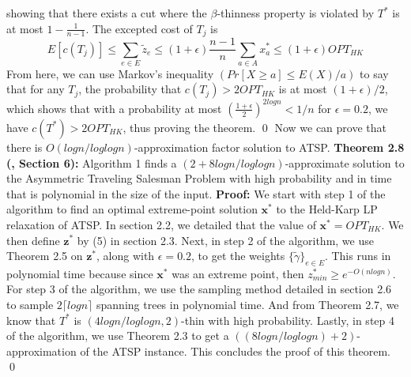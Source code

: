 \documentclass[oneside]{projectpaper} %
\begin{document}
showing that there exists a cut where the $\beta$-thinness property is violated by $T^*$ is at most $1 - \frac{1}{n - 1}$. The excepted cost of $T_j$ is
\begin{equation*}
E[c(T_j)] \leq \sum\limits_{e \in E}\tilde{z}_e \leq (1 + \epsilon)\frac{n - 1}{n}\sum\limits_{a \in A}x_{a}^{*} \leq (1 + \epsilon)OPT_{HK}
\end{equation*}
From here, we can use Markov's inequality $(Pr[X \geq a] \leq E(X)/a)$ to say that for any $T_j$, the probability that $c(T_j) > 2OPT_{HK}$ is at most $(1 + \epsilon)/2$, which shows that with a probability at most $(\frac{1+\epsilon}{2})^{2logn} < 1/n$ for $\epsilon = 0.2$, we have $c(T^*) > 2OPT_{HK}$, thus proving the theorem. \hfill\qed
\newline
\newline
Now we can prove that there is $O(logn / loglogn)$-approximation factor solution to ATSP.
\newline
\newline
\textbf{Theorem 2.8 (\cite{AGM10}, Section 6):} Algorithm 1 finds a $(2 + 8logn / loglogn)$-approximate solution to the Asymmetric Traveling Salesman Problem with high probability and in time that is polynomial in the size of the input.
\newline
\newline
\textbf{Proof:} We start with step 1 of the algorithm to find an optimal extreme-point solution $\textbf{x}^*$ to the Held-Karp LP relaxation of ATSP. In section 2.2, we detailed that the value of $\textbf{x}^* = OPT_{HK}$. We then define $\textbf{z}^*$ by (5) in section 2.3. \newline
\indent Next, in step 2 of the algorithm, we use Theorem 2.5 on $\textbf{z}^*$, along with $\epsilon = 0.2$, to get the weights $\{\tilde{\gamma}\}_{e \in E}$. This runs in polynomial time because since $\textbf{x}^*$ was an extreme point, then $z_{min}^{*} \geq e^{-O(nlogn)}$. \newline
\indent For step 3 of the algorithm, we use the sampling method detailed in section 2.6 to sample $2\lceil logn \rceil$ spanning trees in polynomial time. And from Theorem 2.7, we know that $T^*$ is $(4logn / loglogn, 2)$-thin with high probability. \newline
\indent Lastly, in step 4 of the algorithm, we use Theorem 2.3 to get a $((8logn / loglogn) + 2)$-approximation of the ATSP instance. This concludes the proof of this theorem. \hfill \qed

\end{document}
